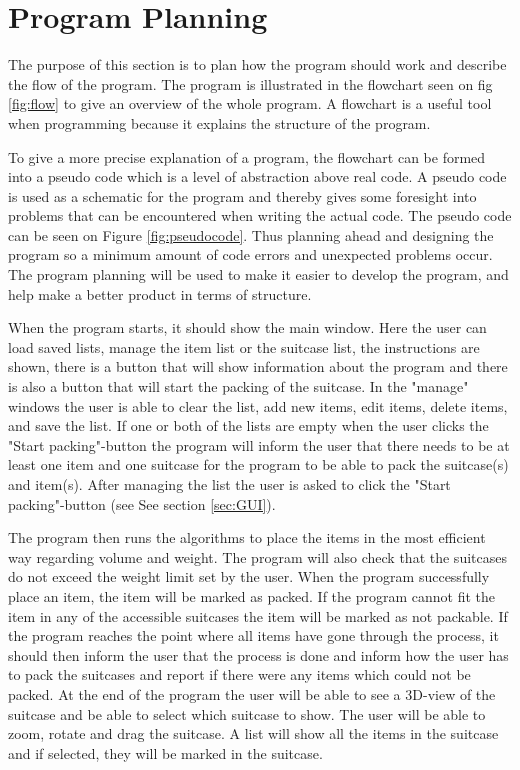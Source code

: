 \section{Program Planning}
The purpose of this section is to plan how the program should work and describe the flow of the program. The program is illustrated in the flowchart seen on fig \ref{fig:flow} to give an overview of the whole program. A flowchart is a useful tool when programming because it explains the structure of the program.

To give a more precise explanation of a program, the flowchart can be formed into a pseudo code which is a level of abstraction above real code. A pseudo code is used as a schematic for the program and thereby gives some foresight into problems that can be encountered when writing the actual code. The pseudo code can be seen on Figure \ref{fig:pseudocode}.
Thus planning ahead and designing the program so a minimum amount of code errors and unexpected problems occur. The program planning will be used to make it easier to develop the program, and help make a better product in terms of structure.

When the program starts, it should show the main window. Here the user can load saved lists, manage the item list or the suitcase list, the instructions are shown, there is a button that will show information about the program and there is also a button that will start the packing of the suitcase. In the "manage" windows the user is able to clear the list, add new items, edit items, delete items, and save the list. If one or both of the lists are empty when the user clicks the "Start packing"-button the program will inform the user that there needs to be at least one item and one suitcase for the program to be able to pack the suitcase(s) and item(s). After managing the list the user is asked to click the "Start packing"-button (see See section \ref{sec:GUI}).

The program then runs the algorithms to place the items in the most efficient way regarding volume and weight. The program will also check that the suitcases do not exceed the weight limit set by the user.
When the program successfully place an item, the item will be marked as packed. If the program cannot fit the item in any of the accessible suitcases the item will be marked as not packable. If the program reaches the point where all items have gone through the process, it should then inform the user that the process is done and inform how the user has to pack the suitcases and report if there were any items which could not be packed.
At the end of the program the user will be able to see a 3D-view of the suitcase and be able to select which suitcase to show. The user will be able to zoom, rotate and drag the suitcase. A list will show all the items in the suitcase and if selected, they will be marked in the suitcase.

